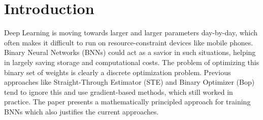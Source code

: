 \section{Introduction}
Deep Learning is moving towards larger and larger parameters day-by-day, which often makes it difficult to run on resource-constraint devices like mobile phones. Binary Neural Networks (BNNs) could act as a savior in such situations, helping in largely saving storage and computational costs. The problem of optimizing this binary set of weights is clearly a discrete optimization problem. Previous approaches like Straight-Through Estimator (STE) and Binary Optimizer (Bop) tend to ignore this and use gradient-based methods, which still worked in practice. The paper presents a mathematically principled approach for training BNNs which also justifies the current approaches.